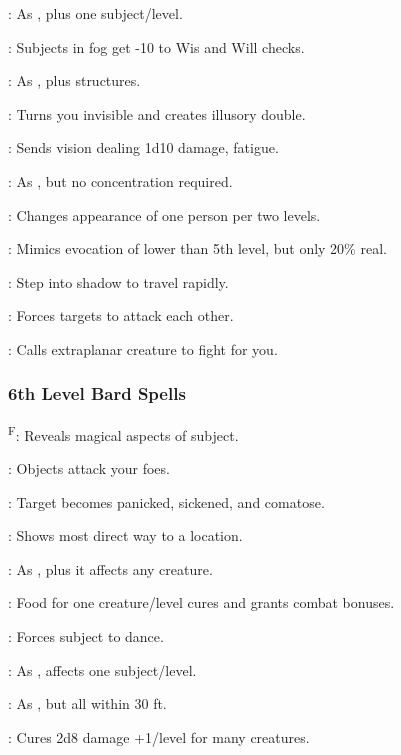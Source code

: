 : As , plus one subject/level.

: Subjects in fog get -10 to Wis and Will checks.

: As , plus structures.

: Turns you invisible and creates illusory double.

: Sends vision dealing 1d10 damage, fatigue.

: As , but no concentration required.

: Changes appearance of one person per two levels.

: Mimics evocation of lower than 5th level, but only 20\% real.

: Step into shadow to travel rapidly.

: Forces targets to attack each other.

: Calls extraplanar creature to fight for you.

\subsubsection{6th Level Bard Spells}

\textsuperscript{F}: Reveals magical aspects of subject.

: Objects attack your foes.

: Target becomes panicked, sickened, and comatose.

: Shows most direct way to a location.

: As , plus it affects any creature.

: Food for one creature/level cures and grants combat bonuses.

: Forces subject to dance.

: As , affects one subject/level.

: As , but all within 30 ft.

: Cures 2d8 damage +1/level for many creatures.

